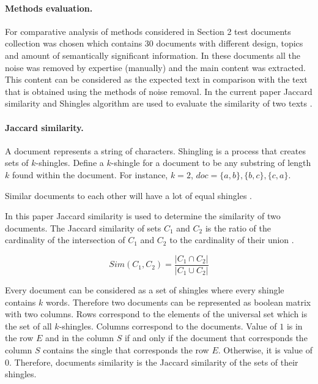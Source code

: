 \paragraph{Methods evaluation.}

For comparative analysis of methods considered in Section 2 test documents collection was chosen which contains 30 documents with different design, topics and amount of semantically significant information. In these documents all the noise was removed by expertise (manually) and the main content was extracted. This content can be considered as the expected text in comparison with the text that is obtained using the methods of noise removal. In the current paper Jaccard similarity and Shingles algorithm are used to evaluate the similarity of two texts \cite{KorelinBlekanovSergeev}.

\paragraph{Jaccard similarity.} A document represents a string of characters. Shingling is a process that creates sets of \(k\)-shingles. Define a \(k\)-shingle for a document to be any substring of length \(k\) found within the document. For instance, \(k = 2\), \(\textit{doc} = \{a, b\}, \{b, c\}, \{c, a\}\).

Similar documents to each other will have a lot of equal shingles \cite{KorelinBlekanovSergeev}.

In this paper Jaccard similarity is used to determine the similarity of two documents. The Jaccard similarity of sets \(C_1\) and \(C_2\) is the ratio of the cardinality of the intersection of \(C_1\) and \(C_2\) to the cardinality of their union \cite{SingthongchaiNiwattanakul}.

\[
\textit{Sim}(C_1, C_2) = \frac{\lvert C_1 \cap C_2\rvert}{\lvert C_1 \cup C_2\rvert}
\]

Every document can be considered as a set of shingles where every shingle contains \(k\) words. Therefore two documents can be represented as boolean matrix with two columns. Rows correspond to the elements of the universal set which is the set of all \(k\)-shingles. Columns correspond to the documents. Value of \(1\) is in the row \(E\) and in the column \(S\) if and only if the document that corresponds the column \(S\) contains the single that corresponds the row \(E\). Otherwise, it is value of \(0\). Therefore, documents similarity is the Jaccard similarity of the sets of their shingles.


